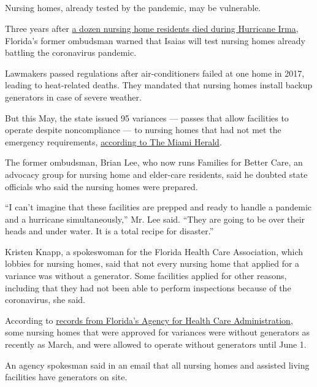 \hypertarget{-2}{%
\subsection{}\label{-2}}

Nursing homes, already tested by the pandemic, may be vulnerable.

Three years after
\href{https://www.nytimes.com/2019/08/24/us/4-charged-holywood-hills-deaths-hurricane-irma-florida.html}{a
dozen nursing home residents died during Hurricane Irma}, Florida's
former ombudsman warned that Isaias will test nursing homes already
battling the coronavirus pandemic.

Lawmakers passed regulations after air-conditioners failed at one home
in 2017, leading to heat-related deaths. They mandated that nursing
homes install backup generators in case of severe weather.

But this May, the state issued 95 variances --- passes that allow
facilities to operate despite noncompliance --- to nursing homes that
had not met the emergency requirements,
\href{https://www.miamiherald.com/article242595251.html}{according to
The Miami Herald}.

The former ombudsman, Brian Lee, who now runs Families for Better Care,
an advocacy group for nursing home and elder-care residents, said he
doubted state officials who said the nursing homes were prepared.

``I can't imagine that these facilities are prepped and ready to handle
a pandemic and a hurricane simultaneously,'' Mr. Lee said. ``They are
going to be over their heads and under water. It is a total recipe for
disaster.''

Kristen Knapp, a spokeswoman for the Florida Health Care Association,
which lobbies for nursing homes, said that not every nursing home that
applied for a variance was without a generator. Some facilities applied
for other reasons, including that they had not been able to perform
inspections because of the coronavirus, she said.

According to
\href{http://apps.ahca.myflorida.com/dm_web/(S(1v0gkxzpdxlo2x3vtgyf1qxk))/doc_results_fo.aspx}{records
from Florida's Agency for Health Care Administration}, some nursing
homes that were approved for variances were without generators as
recently as March, and were allowed to operate without generators until
June 1.

An agency spokesman said in an email that all nursing homes and assisted
living facilities have generators on site.

